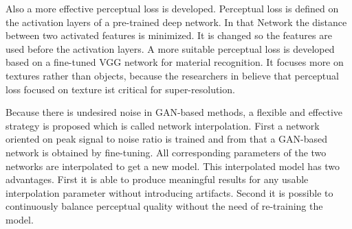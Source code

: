 Also a more effective perceptual loss is developed. Perceptual loss is defined on the activation layers of a pre-trained deep network. In that Network the distance between two activated features is minimized. It is changed so the features are used before the activation layers. A more suitable perceptual loss is developed based on a fine-tuned VGG network for material recognition. It focuses more on textures rather than objects, because the researchers in \cite{wang2018esrgan} believe that perceptual loss focused on texture ist critical for super-resolution.

Because there is undesired noise in GAN-based methods, a flexible and effective strategy is proposed which is called network interpolation. First a network oriented on peak signal to noise ratio is trained and from that a GAN-based network is obtained by fine-tuning. All corresponding parameters of the two networks are interpolated to get a new model. This interpolated model has two advantages. First it is able to produce meaningful results for any usable interpolation parameter without introducing artifacts. Second it is possible to continuously balance perceptual quality without the need of re-training the model.